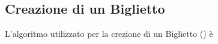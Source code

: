 \subsection{Creazione di un Biglietto}

L'algoritmo utilizzato per la crezione di un Biglietto () è 
